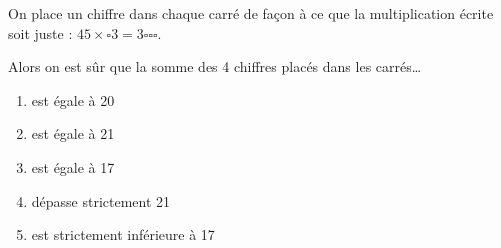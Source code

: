 On place un chiffre dans chaque carré de façon à ce que la multiplication écrite soit juste : $45\times\square3=3\square\square\square$.
\par Alors on est sûr que la somme des 4 chiffres placés dans les carrés\ldots
\begin{multicols}{5}
  \begin{enumerate}[A/]
  \item est égale à 20
  \item est égale à 21
  \item est égale à 17
  \item dépasse strictement 21
  \item est strictement inférieure à 17
  \end{enumerate}
\end{multicols}